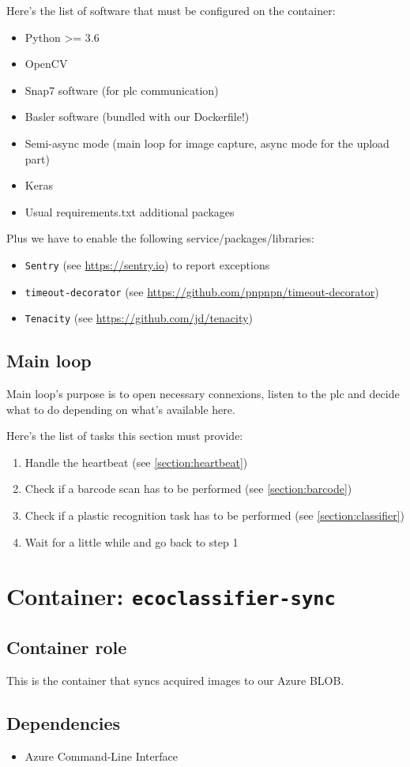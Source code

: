 Here's the list of software that must be configured on the container:

\begin{itemize}
    \item Python >= 3.6
    \item OpenCV
    \item Snap7 software (for \gls{plc} communication)
    \item Basler software (bundled with our Dockerfile!)
    \item Semi-async mode (main loop for image capture, async mode for the upload part)
    \item Keras
    \item Usual requirements.txt additional packages
\end{itemize}

Plus we have to enable the following service/packages/libraries:

\begin{itemize}
    \item \texttt{Sentry} (see \url{https://sentry.io}) to report exceptions
    \item \texttt{timeout-decorator} (see \url{https://github.com/pnpnpn/timeout-decorator})
    \item \texttt{Tenacity} (see \url{https://github.com/jd/tenacity})
\end{itemize}


\subsection{Main loop}

Main loop's purpose is to open necessary connexions, listen to the \gls{plc} and decide what to do depending on what's available here.

Here's the list of tasks this section must provide:

\begin{enumerate}
    \item Handle the \gls{heartbeat} (see \ref{section:heartbeat})
    \item Check if a barcode scan has to be performed (see \ref{section:barcode})
    \item Check if a plastic recognition task has to be performed (see \ref{section:classifier})
    \item Wait for a little while and go back to step 1
\end{enumerate}




\section{Container: \texttt{ecoclassifier-sync}}

\subsection{Container role}

This is the container that syncs acquired images to our Azure BLOB.

\subsection{Dependencies}

\begin{itemize}
    \item Azure Command-Line Interface
\end{itemize}
